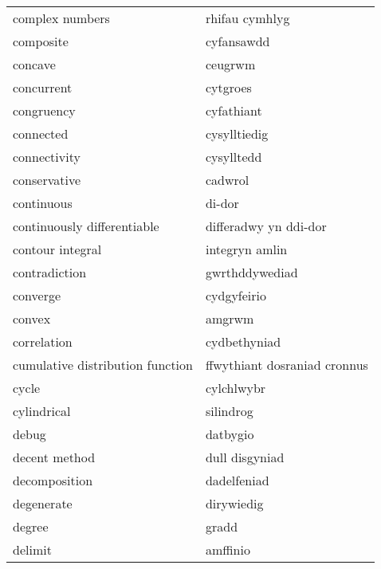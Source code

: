 \begin{supertabular}{p{0.22\textwidth}p{0.22\textwidth}}
                  complex numbers &                   rhifau cymhlyg \\
                        composite &                       cyfansawdd \\
                          concave &                          ceugrwm \\
                       concurrent &                         cytgroes \\
                       congruency &                       cyfathiant \\
                        connected &                     cysylltiedig \\
                     connectivity &                       cysylltedd \\
                     conservative &                          cadwrol \\
                       continuous &                           di-dor \\
      continuously differentiable &            differadwy yn ddi-dor \\
                 contour integral &                   integryn amlin \\
                    contradiction &                   gwrthddywediad \\
                         converge &                      cydgyfeirio \\
                           convex &                           amgrwm \\
                      correlation &                     cydbethyniad \\
 cumulative distribution function &     ffwythiant dosraniad cronnus \\
                            cycle &                       cylchlwybr \\
                      cylindrical &                        silindrog \\
                            debug &                         datbygio \\
                    decent method &                   dull disgyniad \\
                    decomposition &                      dadelfeniad \\
                       degenerate &                       dirywiedig \\
                           degree &                            gradd \\
                          delimit &                         amffinio \\

\end{supertabular}
